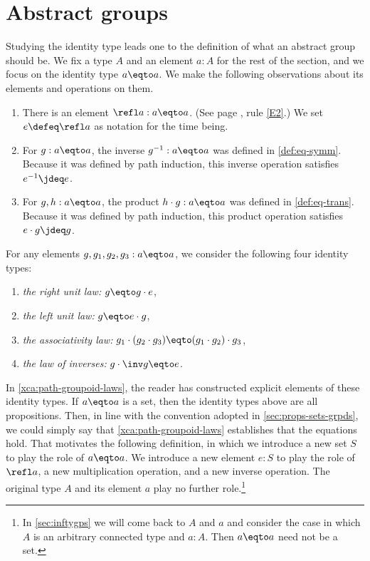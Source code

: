 \section{Abstract groups}
\label{sec:identity-type-as-abstract}

Studying the identity type leads one to the definition of what an 
abstract group should be. We fix a type $A$ and an element $a:A$ for the rest
of the section, and we focus on the identity type $a\eqto a$.
We make the following observations about its elements and operations on them.

\begin{enumerate}
\item
  There is an element $\refl a : a \eqto a$.
  (See page \pageref{rules-for-equality}, rule \ref{E2}.)
  We set $e \defeq \refl a$ as notation for the time being.
\item
  For $g : a \eqto a$, the inverse $g^{-1} : a \eqto a$ was defined in \cref{def:eq-symm}.
  Because it was defined by path induction, this inverse operation satisfies $e^{-1} \jdeq e$.
\item
  For $g, h : a \eqto a$, the product $h \cdot g : a \eqto a$ was defined in \cref{def:eq-trans}.
  Because it was defined by path induction, this product operation satisfies $e \cdot g \jdeq g$.
\end{enumerate}

For any elements $g,g_1,g_2,g_3:a\eqto a$, we consider the 
following four identity types:
\begin{enumerate}
\item
  \label{it:right-unit} \emph{the right unit law:} $g \eqto g\cdot e$,
\item
  \label{it:left-unit} \emph{the left unit law:} $g \eqto e\cdot g$,
\item
  \label{it:associativity} \emph{the associativity law:} $g_1\cdot(g_2\cdot g_3)
  \eqto (g_1\cdot g_2)\cdot g_3$,
\item
  \label{it:inverse} \emph{the law of inverses:} $g\cdot \inv g \eqto e$.
\end{enumerate}

In \cref{xca:path-groupoid-laws}, the reader has constructed explicit
elements of these identity types. 
If $a\eqto a$ is a set, then the identity types
above are all propositions. Then, in line with the convention adopted 
in \cref{sec:props-sets-grpds}, we could simply say that
\cref{xca:path-groupoid-laws} establishes that the equations hold.
That motivates the following definition, 
in which we introduce a new set $S$ to play the role of $a\eqto a$.
We introduce a new element $e:S$ to play the role of $\refl a$, 
a new multiplication operation, and a new inverse operation. 
The original type $A$ and its element $a$ play no further role.\footnote{%
In \cref{sec:inftygps} we will come back to $A$ and $a$ and
consider the case in which $A$ is an arbitrary connected type
and $a:A$. Then $a\eqto a$ need not be a set.}

